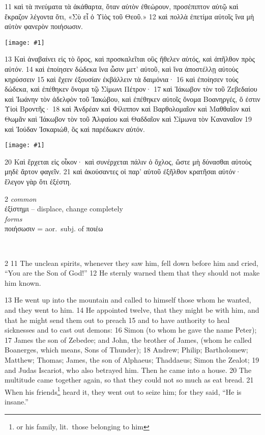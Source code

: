 \documentclass[10pt,a5paper,twoside,twocolumn]{book}
\newcommand{\fig}[1]{\texttt{[image: \#1]}\label{fig:#1}}
\newcommand*\cleartoleftpage{%
  \ifodd\value{page}\hbox{}\clearpage\fi
}
\newcommand{\separator}{
  \vspace{-0.5\baselineskip}%
  \hspace{0.27\textwidth}%
  \noindent\makebox[\linewidth]{\resizebox{0.3333\linewidth}{1pt}{$\bullet$}}\bigskip%
  \vspace{-0.5\baselineskip}
}
\newenvironment{facing}{\cleartoleftpage}{\clearpage\pagebreak}
\newenvironment{help}{\clearpage}{}
\newenvironment{helpsec}{\begin{minipage}[t]{\textwidth}\begin{multicols}{2}}{\end{multicols}\end{minipage}}
\newenvironment{vocab}{\begin{helpsec}}{\end{helpsec}}
\newenvironment{translation}{\separator\\\begin{helpsec}\footnotesize}{\end{helpsec}}
\begin{document}
\begin{facing}

11 καὶ τὰ πνεύματα τὰ ἀκάθαρτα, ὅταν αὐτὸν ἐθεώρουν, προσέπιπτον αὐτῷ καὶ ἔκραζον λέγοντα ὅτι,
«Σὺ εἶ ὁ Υἱὸς τοῦ Θεοῦ.» 12 καὶ πολλὰ ἐπετίμα αὐτοῖς ἵνα μὴ αὐτὸν φανερὸν ποιήσωσιν. 

\fig{03-13} %

13 Καὶ ἀναβαίνει εἰς τὸ ὄρος, καὶ προσκαλεῖται οὓς ἤθελεν αὐτός, καὶ ἀπῆλθον πρὸς αὐτόν. 14 καὶ ἐποίησεν δώδεκα ἵνα ὦσιν μετ’ αὐτοῦ, καὶ ἵνα ἀποστέλλῃ αὐτοὺς κηρύσσειν 15 καὶ ἔχειν ἐξουσίαν ἐκβάλλειν τὰ δαιμόνια· 16 καὶ ἐποίησεν τοὺς δώδεκα, καὶ ἐπέθηκεν ὄνομα τῷ Σίμωνι Πέτρον· 17 καὶ Ἰάκωβον τὸν τοῦ Ζεβεδαίου καὶ Ἰωάνην τὸν ἀδελφὸν τοῦ Ἰακώβου, καὶ ἐπέθηκεν αὐτοῖς ὄνομα Βοανηργές, ὅ ἐστιν Υἱοὶ Βροντῆς· 18 καὶ Ἀνδρέαν καὶ Φίλιππον καὶ Βαρθολομαῖον καὶ Μαθθαῖον καὶ Θωμᾶν καὶ Ἰάκωβον τὸν τοῦ Ἁλφαίου καὶ Θαδδαῖον καὶ Σίμωνα τὸν Καναναῖον 19 καὶ Ἰούδαν Ἰσκαριώθ, ὃς καὶ παρέδωκεν αὐτόν.

\fig{03-20} %

	20 Καὶ ἔρχεται εἰς οἶκον· καὶ συνέρχεται πάλιν ὁ ὄχλος, ὥστε μὴ δύνασθαι αὐτοὺς μηδὲ ἄρτον φαγεῖν. 21 καὶ ἀκούσαντες οἱ παρ’ αὐτοῦ ἐξῆλθον κρατῆσαι αὐτόν· ἔλεγον γὰρ ὅτι ἐξέστη. 

\begin{help}
\begin{vocab}
\emph{common}\\
ἐξίστημι -- displace, change completely\\

\emph{forms}\\
ποιήσωσιν = aor.~subj. of ποιέω\\
\end{vocab}
\begin{translation}
 11 The unclean spirits, whenever they saw him, fell down before him and cried, ``You are the Son of God!'' 12 He sternly warned them that they should not make him known.

13 He went up into the mountain and called to himself those whom he wanted, and they went to him. 14 He appointed twelve, that they might be with him, and that he might send them out to preach 15 and to have authority to heal sicknesses and to cast out demons: 16 Simon (to whom he gave the name Peter); 17 James the son of Zebedee; and John, the brother of James, (whom he called Boanerges, which means, Sons of Thunder); 18 Andrew; Philip; Bartholomew; Matthew; Thomas; James, the son of Alphaeus; Thaddaeus; Simon the Zealot; 19 and Judas Iscariot, who also betrayed him.
Then he came into a house. 20 The multitude came together again, so that they could not so much as eat bread. 21 When his friends\footnote{or his family, lit.~those belonging to him} heard it, they went out to seize him; for they said, ``He is insane.''

\end{translation}
\end{help}
\end{facing}
\end{document}
